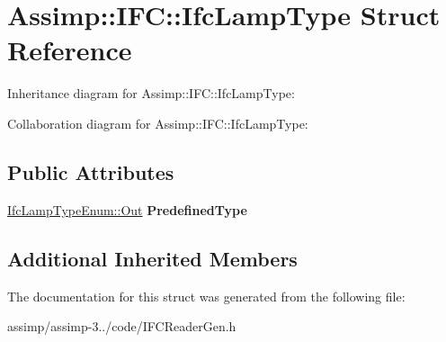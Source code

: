 \hypertarget{struct_assimp_1_1_i_f_c_1_1_ifc_lamp_type}{\section{Assimp\+:\+:I\+F\+C\+:\+:Ifc\+Lamp\+Type Struct Reference}
\label{struct_assimp_1_1_i_f_c_1_1_ifc_lamp_type}
}


Inheritance diagram for Assimp\+:\+:I\+F\+C\+:\+:Ifc\+Lamp\+Type\+:


Collaboration diagram for Assimp\+:\+:I\+F\+C\+:\+:Ifc\+Lamp\+Type\+:
\subsection*{Public Attributes}
\begin{DoxyCompactItemize}
\item 
\hypertarget{struct_assimp_1_1_i_f_c_1_1_ifc_lamp_type_a579e531440281151927a9e191aaa00e2}{\hyperlink{classboost_1_1shared__ptr}{Ifc\+Lamp\+Type\+Enum\+::\+Out} {\bfseries Predefined\+Type}}\label{struct_assimp_1_1_i_f_c_1_1_ifc_lamp_type_a579e531440281151927a9e191aaa00e2}

\end{DoxyCompactItemize}
\subsection*{Additional Inherited Members}


The documentation for this struct was generated from the following file\+:\begin{DoxyCompactItemize}
\item 
assimp/assimp-\/3../code/I\+F\+C\+Reader\+Gen.\+h\end{DoxyCompactItemize}
